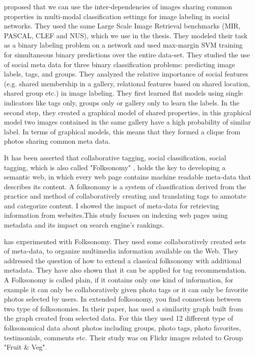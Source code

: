 \citet*{McAuley} proposed that  we can use the inter-dependencies of images sharing common properties in multi-modal classification settings for image labeling in social networks. They used the same Large Scale Image Retrieval benchmarks (MIR, PASCAL, CLEF and NUS), which we use in the thesis. They modeled their task as a binary labeling problem on a network and used
max-margin SVM training for simultaneous binary predictions over the entire data-set.
They studied the use of social meta data for three binary
classification problems: predicting image labels, tags, and groups.
They analyzed the relative importance of social features (e.g.
shared membership in a gallery, relational features based on shared
location, shared group etc.) in image labeling. They first learned
flat models using single indicators like tags only, groups only or
gallery only to learn the labels. In the second step, they created a
graphical model of shared properties, in this graphical model two
images contained in the same gallery have a high probability of
similar label. In terms of graphical models, this means that they
formed a clique from photos sharing common meta data.

It has been asserted that collaborative tagging, social classification, social tagging, which is also called "Folksonomy"
\citet*{wikiFolksonomy}, holds the key to developing a semantic web, in
which every web page contains machine readable meta-data that
describes its content. A folksonomy is a system of classification derived from the practice and method of collaboratively creating and translating tags to annotate and categorize content.  I\citet*{webResource} showed the impact of meta-data for retrieving information
from websites.This study focuses on indexing web pages using metadata and its impact on search engine's rankings.

 has experimented with Folksonomy. They used some collaboratively created sets of meta-data, to organize multimedia information available on the Web. They addressed the question of how to extend a classical folksonomy with additional metadata. They have also shown that it can be applied for tag recommendation.
 A Folksonomy is called plain, if it contains only one kind of information, for example it can only be collaboratively given photo tags or it can only be favorite photos selected by users. In extended folksonomy, you find connection between two type of folksonomies. In their paper, \citet*{kern} has used a similarity graph built from the graph created from selected data. For this they used 12 different type of folksonomical data about photos including groups, photo tags, photo favorites, testimonials, comments etc. Their study was on Flickr images related to Group "Fruit \& Veg".

